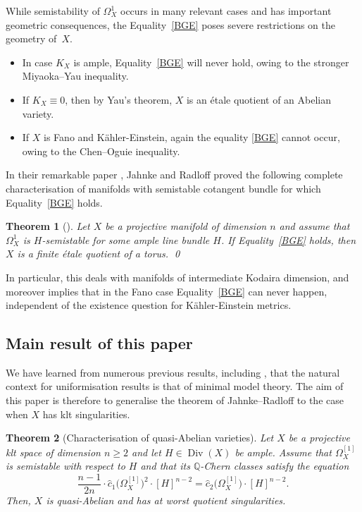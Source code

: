 \documentclass[JEP,XML,SOM,Unicode,published]{cedram}
\theoremstyle{plain}
\newtheorem{thm}{Theorem}[section]
\theoremstyle{definition}
\numberwithin{equation}{thm}
\numberwithin{enumi}{thm}
\DeclareMathOperator{\Div}{Div}
\newcommand{\bQ}{\mathbb{Q}}
\let\what\widehat
\begin{document}
While semistability of $\Omega^1_X$ occurs in many relevant cases and has important
geometric consequences, the Equality~\eqref{BGE} poses severe restrictions on
the geometry of~$X$.
\begin{itemize}
\item In case $K_X$ is ample, Equality~\eqref{BGE} will never hold, owing to the
stronger Miyaoka--Yau inequality.

\item If $K_X \equiv 0$, then by Yau's theorem, $X$ is an étale quotient of an
Abelian variety.

\item If $X$ is Fano and Kähler-Einstein, again the equality \eqref{BGE} cannot
occur, owing to the Chen--Oguie inequality.
\end{itemize}
In their remarkable paper \cite{MR3030068}, Jahnke and Radloff proved the
following complete characterisation of manifolds with semistable cotangent
bundle for which Equality~\eqref{BGE} holds.

\begin{thm}[]
Let $X$ be a projective manifold of dimension $n$ and assume that $\Omega^1_X$ is
$H$-semistable for some ample line bundle $H$. If Equality~\eqref{BGE} holds,
then $X$ is a finite étale quotient of a torus. \qed
\end{thm}

In particular, this deals with manifolds of intermediate Kodaira dimension, and
moreover implies that in the Fano case Equality~\eqref{BGE} can never happen,
independent of the existence question for Kähler-Einstein metrics.

\subsection{Main result of this paper}

We have learned from numerous previous results, including \cite{GKP13, LT18,
GKT16, GKPT19, GKPT19b, GKP20a}, that the natural context for uniformisation
results is that of minimal model theory. The aim of this paper is therefore to
generalise the theorem of Jahnke--Radloff to the case when $X$ has klt
singularities.

\begin{thm}[Characterisation of quasi-Abelian varieties]\label{thm:charQAbelian}
Let $X$ be a projective klt space of dimension $n \geq 2$ and let $H \in \Div(X)$
be ample. Assume that $\Omega^{[1]}_X$ is semistable with respect to $H$ and that
its $\bQ$-Chern classes satisfy the equation
\begin{equation}\label{eq:qcce}
\frac{n-1}{2n}\cdot \what{c}_1 \bigl(\Omega^{[1]}_X \bigr)^2\cdot [H]^{n-2}
= \what{c}_2 \bigl(\Omega^{[1]}_X \bigr)\cdot [H]^{n-2}.
\end{equation}
Then, $X$ is quasi-Abelian and has at worst quotient singularities.
\end{thm}
\end{document}
